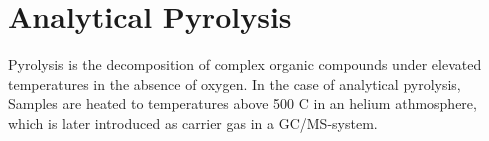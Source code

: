 \section{Analytical Pyrolysis}

Pyrolysis is the decomposition of complex organic compounds under elevated temperatures in the absence of oxygen. In the case of analytical pyrolysis, Samples are heated to temperatures above 500 \textedegree C in an helium athmosphere, which is later introduced as carrier gas in a GC/MS-system.







